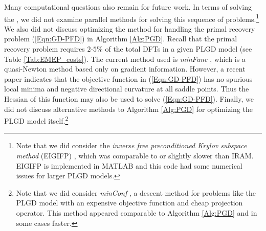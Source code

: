 Many computational questions also remain for future work.
In terms of solving the \emep, we did not examine parallel methods for solving this sequence of problems.\footnote{
Note that we did consider the \textit{inverse free preconditioned Krylov subspace method} (EIGIFP) \cite{golub2002inverse}, which was comparable to or slightly slower than IRAM.  EIGIFP is implemented in MATLAB and this code had some numerical issues for larger PLGD models.
}
We also did not discuss optimizing the method for handling the primal recovery problem (\ref{Eqn:GD-PFD}) in Algorithm \ref{Alg:PGD}.
Recall that the primal recovery problem requires $2$-$5\%$ of the total DFTs in a given PLGD model (see Table \ref{Tab:EMEP_costs}).
The current method used is \textit{minFunc} \cite{schmidt2005minFunc}, which is a quasi-Newton method based only on gradient information.
However, a recent paper \cite{sun2016geometric} indicates that the objective function in (\ref{Eqn:GD-PFD}) has no spurious local minima and negative directional curvature at all saddle points.
Thus the Hessian of this function may also be used to solve (\ref{Eqn:GD-PFD}).
Finally, we did not discuss alternative methods to Algorithm \ref{Alg:PGD} for optimizing the PLGD model itself.\footnote{
Note that we did consider \textit{minConf} \cite{schmidt2008minConf}, a descent method for problems like the PLGD model with an expensive objective function and cheap projection operator.  This method appeared comparable to Algorithm \ref{Alg:PGD} and in some cases faster.
}







